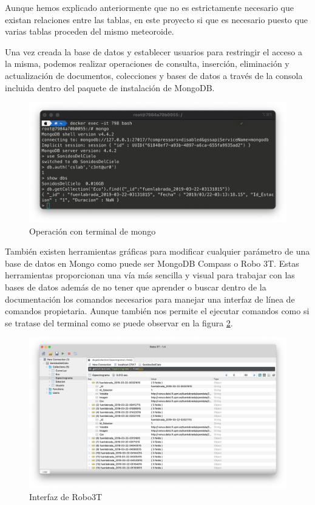 Aunque hemos explicado anteriormente que no es estrictamente necesario que existan relaciones entre las tablas, en este proyecto si que es necesario puesto que varias tablas proceden del mismo meteoroide.

Una vez creada la base de datos y establecer usuarios para restringir el acceso a la misma, podemos realizar operaciones de consulta, inserción, eliminación y actualización de documentos, colecciones y bases de datos a través de la consola incluida dentro del paquete de instalación de MongoDB. 

\begin{figure}[H]
    \centering
    \includegraphics[scale=0.4]{include/capturas/TerminalMongo.png}
    \caption{Operación con terminal de mongo}
    \label{fig:terminal_mongo}
\end{figure}

También existen herramientas gráficas para modificar cualquier parámetro de una base de datos en Mongo como puede ser MongoDB Compass o Robo 3T. Estas herramientas proporcionan una vía más sencilla y visual para trabajar con las bases de datos además de no tener que aprender o buscar dentro de la documentación los comandos necesarios para manejar una interfaz de línea de comandos propietaria. Aunque también nos permite el ejecutar comandos como si se tratase del terminal como se puede observar en la figura \ref{fig:robo3t}.

\begin{figure}[H]
    \centering
    \includegraphics[scale=0.3]{include/capturas/Robo3T.png}
    \caption{Interfaz de Robo3T}
    \label{fig:robo3t}
\end{figure}

